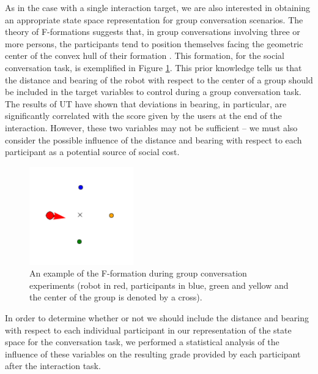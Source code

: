 \documentclass[a4paper,11pt]{report}
\begin{document}
As in the case with a single interaction target, we are also interested in obtaining an appropriate state space representation for group conversation scenarios. The theory of F-formations suggests that, in group conversations involving three or more persons, the participants tend to position themselves facing the geometric center of the convex hull of their formation \cite{kendon1990conducting}. This formation, for the social conversation task, is exemplified in Figure \ref{fig:F-formation_experiment}. This prior knowledge tells us that the distance and bearing of the robot with respect to the center of a group should be included in the target variables to control during a group conversation task. The results of UT have shown that deviations in bearing, in particular, are significantly correlated with the score given by the users at the end of the interaction. However, these two variables may not be sufficient -- we must also consider the possible influence of the distance and bearing with respect to each participant as a potential source of social cost.

\begin{figure}
    \centering
    \includegraphics[width=0.4\textwidth]{figures/o-space_twente_data.png}
    \caption{An example of the F-formation during group conversation experiments (robot in red, participants in blue, green and yellow and the center of the group is denoted by a cross).}
    	\label{fig:F-formation_experiment}
\end{figure} 

In order to determine whether or not we should include the distance and bearing with respect to each individual participant in our representation of the state space for the conversation task, we performed a statistical analysis of the influence of these variables on the resulting grade provided by each participant after the interaction task.
\end{document}
